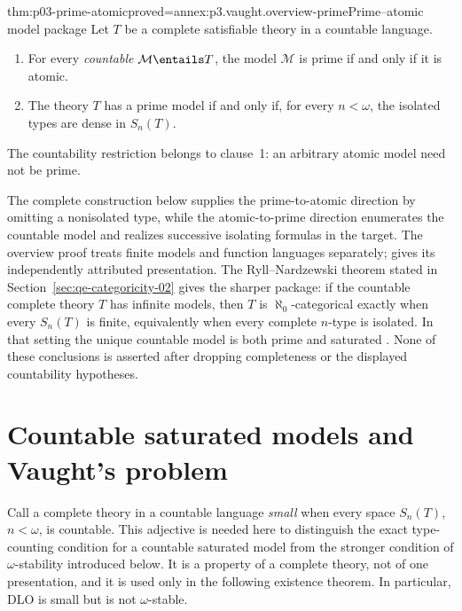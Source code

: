 \begin{hbtheorem}{thm:p03-prime-atomic}{proved=annex:p3.vaught.overview-prime}{Prime--atomic model package}
Let \(T\) be a complete satisfiable theory in a countable language.
\begin{enumerate}
  \item For every \emph{countable} \(\mathcal M\entails T\), the model
        \(\mathcal M\) is prime if and only if it is atomic.
  \item The theory \(T\) has a prime model if and only if, for every
        \(n<\omega\), the isolated types are dense in \(S_n(T)\).
\end{enumerate}
The countability restriction belongs to clause~1: an arbitrary atomic model
need not be prime.
\end{hbtheorem}

The complete construction below supplies the prime-to-atomic direction by
omitting a nonisolated type, while the atomic-to-prime direction enumerates
the countable model and realizes successive isolating formulas in the target.
The overview proof treats finite models and function languages separately;
\cite{Marker2002} gives its independently attributed presentation.
The Ryll--Nardzewski theorem stated in
Section~\ref{sec:qe-categoricity-02} gives the sharper package: if the
countable complete theory \(T\) has infinite
models, then \(T\) is \(\aleph_0\)-categorical exactly when every
\(S_n(T)\) is finite, equivalently when every complete \(n\)-type is isolated.
In that setting the unique countable model is both prime and saturated
\cite{RyllNardzewski1959,Engeler1959,Svenonius1959}.  None of these conclusions
is asserted after dropping completeness or the displayed countability
hypotheses.




\section{Countable saturated models and Vaught's problem}
\label{sec:p03-countable-models}

Call a complete theory in a countable language \emph{small} when every
space \(S_n(T)\), \(n<\omega\), is countable.  This adjective is needed here
to distinguish the exact type-counting condition for a countable saturated
model from the stronger condition of \(\omega\)-stability introduced below.
It is a property of a complete theory, not of one presentation, and it is used
only in the following existence theorem.  In particular, DLO is small but is
not \(\omega\)-stable.

